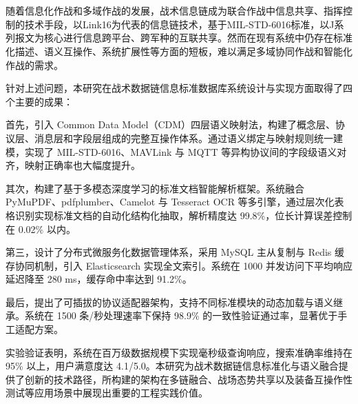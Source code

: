 \chapter*{\xiaosan{}}

随着信息化作战和多域作战的发展，战术信息链成为联合作战中信息共享、指挥控制的技术手段，以Link16为代表的信息链技术，基于MIL-STD-6016标准，以J系列报文为核心进行信息跨平台、跨军种的互联共享。然而在现有系统中仍存在标准化描述、语义互操作、系统扩展性等方面的短板，难以满足多域协同作战和智能化作战的需求。

针对上述问题，本研究在战术数据链信息标准数据库系统设计与实现方面取得了四个主要的成果：

首先，引入 Common Data Model（CDM）四层语义映射法，构建了概念层、协议层、消息层和字段层组成的完整互操作体系。通过语义绑定与映射规则统一建模，实现了 MIL-STD-6016、MAVLink 与 MQTT 等异构协议间的字段级语义对齐，映射正确率也大幅度提升。

其次，构建了基于多模态深度学习的标准文档智能解析框架。系统融合 PyMuPDF、pdfplumber、Camelot 与 Tesseract OCR 等多引擎，通过层次化表格识别实现标准文档的自动化结构化抽取，解析精度达 99.8\%，位长计算误差控制在 0.02\% 以内。

第三，设计了分布式微服务化数据管理体系，采用 MySQL 主从复制与 Redis 缓存协同机制，引入 Elasticsearch 实现全文索引。系统在 1000 并发访问下平均响应延迟降至 280 ms，缓存命中率达到 91.2\%。

最后，提出了可插拔的协议适配器架构，支持不同标准模块的动态加载与语义继承。系统在 1500 条/秒处理速率下保持 98.9\% 的一致性验证通过率，显著优于手工适配方案。

实验验证表明，系统在百万级数据规模下实现毫秒级查询响应，搜索准确率维持在 95\% 以上，用户满意度达 4.1/5.0。本研究为战术数据链信息标准化与语义融合提供了创新的技术路径，所构建的架构在多链融合、战场态势共享以及装备互操作性测试等应用场景中展现出重要的工程实践价值。
\vspace{0.5cm}

